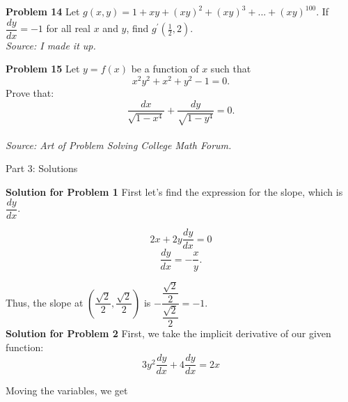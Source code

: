 \documentclass{article}
\newcommand \der {\frac {dy} {dx}}
\begin{document}
\vspace{1cm}

\textbf{Problem 14} Let $g\left( x, y \right) = 1 + xy + \left( xy \right)^2 + \left( xy \right)^3 + ... + \left( xy \right)^{100}$. If $\dfrac {dy} {dx} = -1$ for all real $x$ and $y$, find $g^{\prime}\left( \frac {1} {2}, 2 \right)$.\\
\textit{Source: I made it up.}

\vspace{1cm}

\begin{comment}
	\textbf{Problem 14} The 2 functions $4x^2 + ay^2 - 36 = 0$ and $bx^2 + 25y^2 -100 = 0$ have the same absolute minimum point. Find $ab$. \\ 
	\textit{Source: I made it up.}
	
	\vspace{1cm}
	
\end{comment}

\newpage

\textbf{Problem 15} Let $y = f(x)$ be a function of $x$ such that
\[x^2y^2 + x^2 + y^2 - 1 = 0.\]
Prove that:
\[\dfrac {dx} {\sqrt{1 - x^4}} + \dfrac {dy} {\sqrt{1 - y^4}} = 0.\]
\\
\textit{Source: Art of Problem Solving College Math Forum.}

\newpage

\begin{comment}
	Implicit Differentiation Solutions
\end{comment}

\LARGE Part 3: Solutions

\vspace{2cm}

\large

\textbf{Solution for Problem 1} First let's find the expression for the slope, which is $\dfrac {dy} {dx}$. 

\[2x + 2y\frac {dy} {dx} = 0\]
\[\frac {dy} {dx} = -\frac {x} {y}.\]

Thus, the slope at $\left( \dfrac {\sqrt{2}} {2}, \dfrac {\sqrt {2}} {2} \right)$ is $-\dfrac { \dfrac {\sqrt{2}} {2} } { \dfrac {\sqrt {2}} {2} } = -1.$\\

\textbf{Solution for Problem 2} First, we take the implicit derivative of our given function:\\

\[3y^2\der + 4\der = 2x\]

Moving the variables, we get
\end{document}
